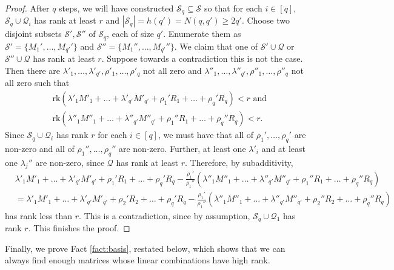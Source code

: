 \documentclass[12pt,oneside,british,a4wide]{amsart}
\numberwithin{equation}{section}
\theoremstyle{definition}
\newcommand{\calQ}{\mathcal{Q}}
\newcommand{\calS}{\mathcal{S}}
\newcommand{\rk}{{\mathrm{rk}}}
\begin{document}
\begin{proof}
After $q$ steps, we will have constructed  $\calS_q \subseteq  \calS$  so that for each $i\in [q]$, $\calS_q\cup \calQ_i$ has rank at least $r$ and $|\calS_q|=h(q')=N(q,q')\geq 2q'$.  Choose two disjoint subsets $\calS',  \calS''$ of $\calS_q$, each of size $q'$.  Enumerate them as $\calS'=\{M_1',\ldots, M_{q'}'\}$ and $\calS''=\{M_1'',\ldots, M_{q'}''\}$.  We claim that one of $\calS'\cup \calQ$ or $\calS''\cup \calQ$  has rank at least $r$.    Suppose towards a contradiction this is not the case.  Then there are $\lambda'_1,\ldots, \lambda'_{q'},\rho'_1,\ldots, \rho'_q$ not all zero and $\lambda''_1,\ldots, \lambda''_{q'},\rho''_1,\ldots, \rho''_q$ not all zero such that
\begin{align*}
&\rk(\lambda'_1 M'_1+\ldots +\lambda'_{q'}M'_{q'}+\rho_1'R_1+\ldots+\rho_q'R_q)<r\text{ and }\\
&\rk(\lambda''_1 M''_1+\ldots +\lambda''_{q'}M''_{q'}+\rho_1''R_1+\ldots+\rho_q''R_q)<r.
\end{align*}
Since $\calS_q\cup \calQ_i$ has rank $r$ for each $i\in [q]$,  we must have that all of $\rho_1',\ldots, \rho_q'$ are non-zero and all of $\rho_1'',\ldots, \rho_q''$ are non-zero.  Further, at least one $\lambda'_i$ and at least one $\lambda_j''$ are non-zero, since $\calQ$ has rank at least $r$.  Therefore, by subadditivity,
\begin{align*}
&\lambda'_1 M'_1+\ldots +\lambda'_{q'}M'_{q'}+\rho_1'R_1+\ldots+\rho_q'R_q-\frac{\rho_1'}{\rho_1''}(\lambda''_1 M''_1+\ldots +\lambda''_{q'}M''_{q'}+\rho_1''R_1+\ldots+\rho_q''R_q)\\
&=\lambda'_1 M'_1+\ldots +\lambda'_{q'}M'_{q'}+\rho_2'R_2+\ldots+\rho_q'R_q-\frac{\rho_1'}{\rho_1''}(\lambda''_1 M''_1+\ldots +\lambda''_{q'}M''_{q'}+\rho_2''R_2+\ldots+\rho_q''R_q)
\end{align*}
has rank less than $r$.  This is a contradiction, since by assumption, $\calS_q\cup \calQ_1$ has rank $r$.  This finishes the proof.
\end{proof}

Finally, we prove Fact \ref{fact:basis}, restated below, which shows that we can always find enough matrices whose linear combinations have high rank. 
\end{document}
